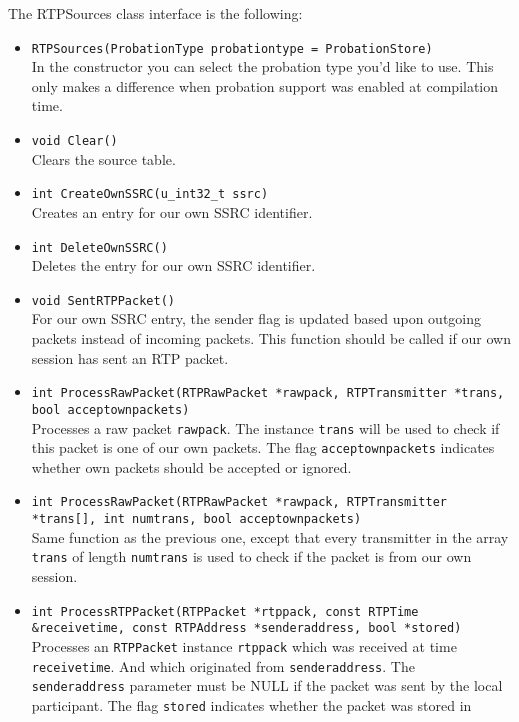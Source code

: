 \documentclass[12pt,a4paper]{article}
\begin{document}
				The RTPSources class interface is the following:
				\begin{itemize}
					\item {\tt RTPSources(ProbationType probationtype = ProbationStore)}\\
						In the constructor you can select the probation type you'd like
						to use. This only makes a difference when probation support was
						enabled at compilation time.
					\item {\tt void Clear()}\\
						Clears the source table.
					\item {\tt int CreateOwnSSRC(u\_int32\_t ssrc)}\\
						Creates an entry for our own SSRC identifier.
					\item {\tt int DeleteOwnSSRC()}\\
						Deletes the entry for our own SSRC identifier.
					\item {\tt void SentRTPPacket()}\\
						For our own SSRC entry, the sender flag is updated based
						upon outgoing packets instead of incoming packets. This
						function should be called if our own session has sent an
						RTP packet.
					\item {\tt int ProcessRawPacket(RTPRawPacket *rawpack, RTPTransmitter *trans, bool acceptownpackets)}\\
						Processes a raw packet {\tt rawpack}. The instance {\tt trans} will be used to
						check if this packet is one of our own packets. The flag {\tt acceptownpackets}
						indicates whether own packets should be accepted or ignored.
					\item {\tt int ProcessRawPacket(RTPRawPacket *rawpack, RTPTransmitter *trans[], int numtrans, bool acceptownpackets)}\\
						Same function as the previous one, except that every transmitter
						in the array {\tt trans} of length {\tt numtrans} is used
						to check if the packet is from our own session.
					\item {\tt int ProcessRTPPacket(RTPPacket *rtppack, const RTPTime \&receivetime, const RTPAddress *senderaddress, bool *stored)}\\
						Processes an {\tt RTPPacket} instance {\tt rtppack} which was 
						received at time {\tt receivetime}. And which originated from
						{\tt senderaddress}. The {\tt senderaddress} parameter must
						be NULL if the packet was sent by the local participant. The
						flag {\tt stored} indicates whether the packet was stored in

\end{itemize}
\end{document}
